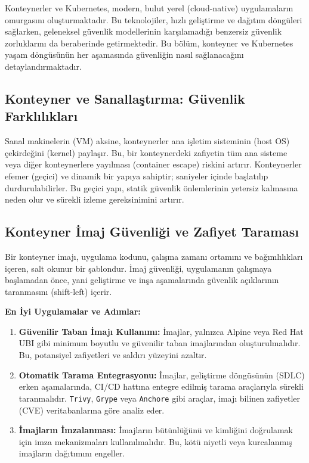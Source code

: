 Konteynerler ve Kubernetes, modern, bulut yerel (cloud-native) uygulamaların omurgasını oluşturmaktadır. Bu teknolojiler, hızlı geliştirme ve dağıtım döngüleri sağlarken, geleneksel güvenlik modellerinin karşılamadığı benzersiz güvenlik zorluklarını da beraberinde getirmektedir. Bu bölüm, konteyner ve Kubernetes yaşam döngüsünün her aşamasında güvenliğin nasıl sağlanacağını detaylandırmaktadır.

\subsection{Konteyner ve Sanallaştırma: Güvenlik Farklılıkları}

Sanal makinelerin (VM) aksine, konteynerler ana işletim sisteminin (host OS) çekirdeğini (kernel) paylaşır. Bu, bir konteynerdeki zafiyetin tüm ana sisteme veya diğer konteynerlere yayılması (container escape) riskini artırır. Konteynerler efemer (geçici) ve dinamik bir yapıya sahiptir; saniyeler içinde başlatılıp durdurulabilirler. Bu geçici yapı, statik güvenlik önlemlerinin yetersiz kalmasına neden olur ve sürekli izleme gereksinimini artırır.

\subsection{Konteyner İmaj Güvenliği ve Zafiyet Taraması}

Bir konteyner imajı, uygulama kodunu, çalışma zamanı ortamını ve bağımlılıkları içeren, salt okunur bir şablondur. İmaj güvenliği, uygulamanın çalışmaya başlamadan önce, yani geliştirme ve inşa aşamalarında güvenlik açıklarının taranmasını (shift-left) içerir.

\textbf{En İyi Uygulamalar ve Adımlar:}

\begin{enumerate}
    \item \textbf{Güvenilir Taban İmajı Kullanımı:} İmajlar, yalnızca Alpine veya Red Hat UBI gibi minimum boyutlu ve güvenilir taban imajlarından oluşturulmalıdır. Bu, potansiyel zafiyetleri ve saldırı yüzeyini azaltır.
    \item \textbf{Otomatik Tarama Entegrasyonu:} İmajlar, geliştirme döngüsünün (SDLC) erken aşamalarında, CI/CD hattına entegre edilmiş tarama araçlarıyla sürekli taranmalıdır. \texttt{Trivy}, \texttt{Grype} veya \texttt{Anchore} gibi araçlar, imajı bilinen zafiyetler (CVE) veritabanlarına göre analiz eder.
    \item \textbf{İmajların İmzalanması:} İmajların bütünlüğünü ve kimliğini doğrulamak için imza mekanizmaları kullanılmalıdır. Bu, kötü niyetli veya kurcalanmış imajların dağıtımını engeller.
\end{enumerate}

